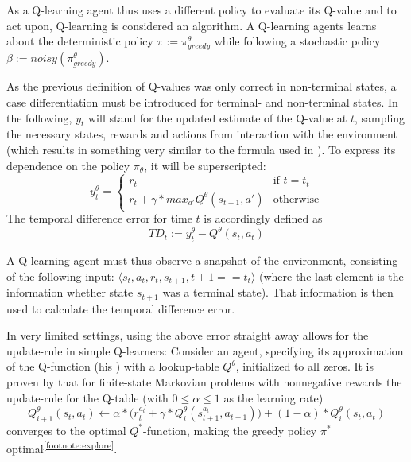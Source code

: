 As a Q-learning agent thus uses a different policy to evaluate its Q-value and to act upon, Q-learning is considered an  algorithm. A Q-learning agents learns about the deterministic policy $\pi := \pi^\theta_{greedy}$ while following a stochastic policy $\beta := noisy(\pi^\theta_{greedy})$.

As the previous definition of Q-values was only correct in non-terminal states, a case differentiation must be introduced for terminal- and non-terminal states. In the following, $y_t$ will stand for the updated estimate of the Q-value at $t$, sampling the necessary states, rewards and actions from interaction with the environment (which results in something very similar to the formula used in \cite{mnih_human-level_2015}). To express its dependence on the policy $\pi_\theta$, it will be superscripted:
\begin{equation} \label{eq:ycases}
	y_t^{\theta} = \begin{cases} 
		r_t & \text{if } t = t_t\\
		r_t + \gamma * max_{a'} Q^\theta( s_{t+1}, a') & \text{otherwise}
\end{cases}
\end{equation}
The temporal difference error for time $t$ is accordingly defined as 
\begin{equation}
TD_t := y_t^\theta - Q^\theta(s_t, a_t)
\end{equation}

A Q-learning agent must thus observe a snapshot of the environment, consisting of the following input: $\langle s_t, a_t, r_t, s_{t+1}, t+1==t_t \rangle$ (where the last element is the information whether state $s_{t+1}$ was a terminal state). That information is then used to calculate the temporal difference error.

In very limited settings, using the above error straight away allows for the update-rule in simple Q-learners: Consider an agent, specifying its approximation of the Q-function (his ) with a lookup-table $Q^\theta$, initialized to all zeros. It is proven by \cite{watkins_technical_1992} that for finite-state Markovian problems with nonnegative rewards the update-rule for the Q-table (with $0 \leq \alpha \leq 1$ as the learning rate)
\begin{equation} \label{eq:qtable}
	Q^\theta_{i+1}(s_t,a_t) \leftarrow \alpha * \Big(r_t^{a_t} + \gamma * Q^\theta_i(s_{t+1}^{a_t},a_{t+1}) \Big) + (1-\alpha) * Q^\theta_i(s_t,a_t)
\end{equation}
converges to the optimal $Q^*$-function, making the greedy policy $\pi^*$ optimal\textsuperscript{\ref{footnote:explore}}. \\

